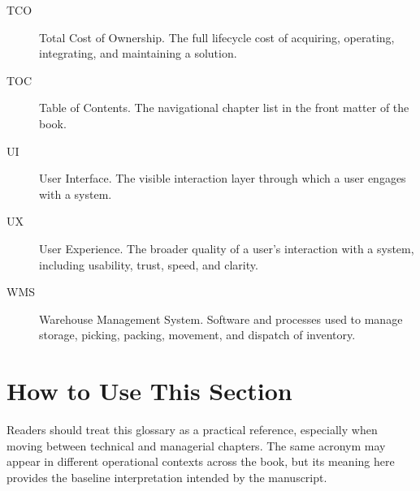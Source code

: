 \begin{description}
  \item[TCO] Total Cost of Ownership. The full lifecycle cost of acquiring, operating, integrating, and maintaining a solution.
  \item[TOC] Table of Contents. The navigational chapter list in the front matter of the book.
  \item[UI] User Interface. The visible interaction layer through which a user engages with a system.
  \item[UX] User Experience. The broader quality of a user’s interaction with a system, including usability, trust, speed, and clarity.
  \item[WMS] Warehouse Management System. Software and processes used to manage storage, picking, packing, movement, and dispatch of inventory.
\end{description}

\section*{How to Use This Section}
Readers should treat this glossary as a practical reference, especially when moving between technical and managerial chapters.
The same acronym may appear in different operational contexts across the book, but its meaning here provides the baseline interpretation intended by the manuscript.
